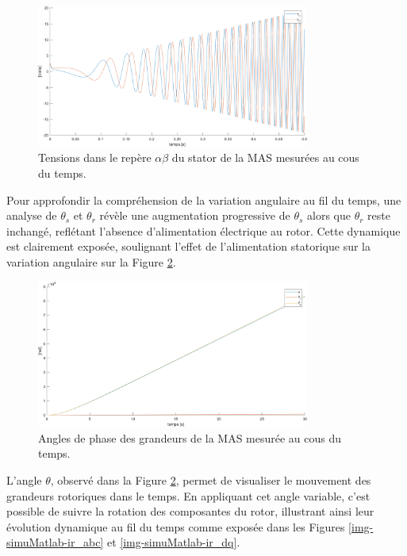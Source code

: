 \begin{figure}[!h]
    \centering
    \includegraphics[width=0.8\textwidth]{simusMATLAB/MAS/Vs_alphabeta.png} 
    \caption{Tensions dans le repère $\alpha\beta$ du stator de la MAS mesurées au cous du temps.}
    \label{img-simuMatlab-Vs_alphabeta}
\end{figure}

Pour approfondir la compréhension de la variation angulaire au fil du temps, une analyse de \(\theta_s\) et \(\theta_r\) révèle une augmentation progressive de \(\theta_s\) alors que \(\theta_r\) reste inchangé, reflétant l'absence d'alimentation électrique au rotor. Cette dynamique est clairement exposée, soulignant l'effet de l'alimentation statorique sur la variation angulaire sur la Figure \ref{img-simuMatlab-thetas}.


\begin{figure}[!h]
    \centering
    \includegraphics[width=0.8\textwidth]{simusMATLAB/MAS/thetas.png} 
    \caption{Angles de phase des grandeurs de la MAS mesurée au cous du temps.}
    \label{img-simuMatlab-thetas}
\end{figure}


L'angle \(\theta\), observé dans la Figure \ref{img-simuMatlab-thetas}, permet de visualiser le mouvement des grandeurs rotoriques dans le temps. En appliquant cet angle variable, c'est possible de suivre la rotation des composantes du rotor, illustrant ainsi leur évolution dynamique au fil du temps comme exposée dans les Figures \ref{img-simuMatlab-ir_abc} et \ref{img-simuMatlab-ir_dq}.


